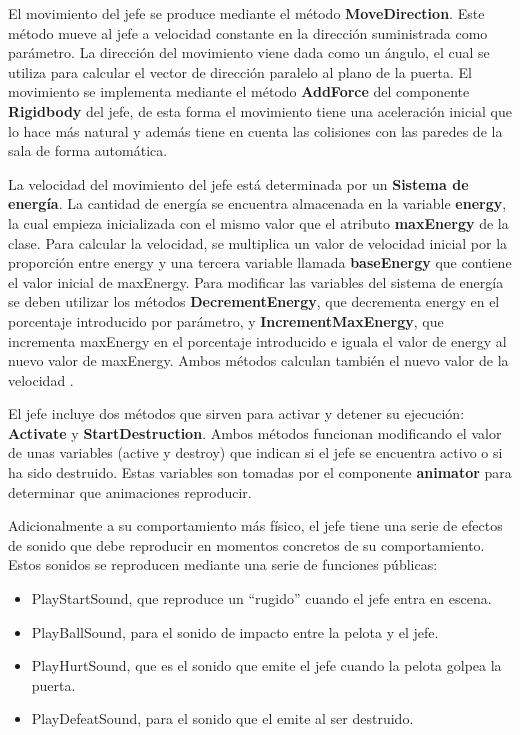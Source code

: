El movimiento del jefe se produce mediante el método \textbf{MoveDirection}. Este método mueve al jefe a velocidad constante en la dirección suministrada como parámetro. La dirección del movimiento viene dada como un ángulo, el cual se utiliza para calcular el vector de dirección paralelo al plano de la puerta. El movimiento se implementa mediante el método \textbf{AddForce} del componente \textbf{Rigidbody} del jefe, de esta forma el movimiento tiene una aceleración inicial que lo hace más natural y además tiene en cuenta las colisiones con las paredes de la sala de forma automática.

La velocidad del movimiento del jefe está determinada por un \textbf{Sistema de energía}. La cantidad de energía se encuentra almacenada en la variable \textbf{energy}, la cual empieza inicializada con el mismo valor que el atributo \textbf{maxEnergy} de la clase. Para calcular la velocidad, se multiplica un valor de velocidad inicial por la proporción entre energy y una tercera variable llamada \textbf{baseEnergy} que contiene el valor inicial de maxEnergy. Para modificar las variables del sistema de energía se deben utilizar los métodos \textbf{DecrementEnergy}, que decrementa energy en el porcentaje introducido por parámetro, y \textbf{IncrementMaxEnergy}, que incrementa maxEnergy en el porcentaje introducido e iguala el valor de energy al nuevo valor de maxEnergy. Ambos métodos calculan también el nuevo valor de la velocidad .

El jefe incluye dos métodos que sirven para activar y detener su ejecución: \textbf{Activate} y \textbf{StartDestruction}. Ambos métodos funcionan modificando el valor de unas variables (active y destroy) que indican si el jefe se encuentra activo o si ha sido destruido. Estas variables son tomadas por el componente \textbf{animator} para determinar que animaciones reproducir.

Adicionalmente a su comportamiento más físico, el jefe tiene una serie de efectos de sonido que debe reproducir en momentos concretos de su comportamiento. Estos sonidos se reproducen mediante una serie de funciones públicas:
\begin{itemize}
\item PlayStartSound, que reproduce un ``rugido'' cuando el jefe entra en escena.
\item PlayBallSound, para el sonido de impacto entre la pelota y el jefe.
\item PlayHurtSound, que es el sonido que emite el jefe cuando la pelota golpea la puerta.
\item PlayDefeatSound, para el sonido que el emite al ser destruido.
\end{itemize}

